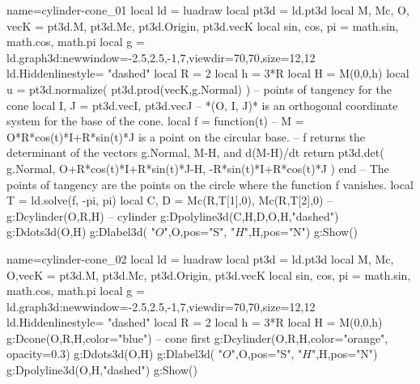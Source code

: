 \documentclass[border=3pt]{standalone}%
\begin{document}
\begin{luadraw}{name=cylinder-cone_01}
local ld = luadraw
local pt3d = ld.pt3d
local M, Mc, O, vecK = pt3d.M, pt3d.Mc, pt3d.Origin,  pt3d.vecK
local sin, cos, pi = math.sin, math.cos, math.pi
local g = ld.graph3d:new{window={-2.5,2.5,-1,7},viewdir={70,70},size={12,12}}
ld.Hiddenlinestyle= "dashed"
local R = 2
local h = 3*R
local H = M(0,0,h)
local u = pt3d.normalize( pt3d.prod(vecK,g.Normal) )
-- points of tangency for the cone
local I, J = pt3d.vecI, pt3d.vecJ -- *(O, I, J)* is an orthogonal coordinate system for the base of the cone.
local f = function(t) 
-- M = O*R*cos(t)*I+R*sin(t)*J is a point on the circular base.
-- f returns the determinant of the vectors g.Normal, M-H, and d(M-H)/dt
    return pt3d.det( g.Normal, O+R*cos(t)*I+R*sin(t)*J-H, -R*sin(t)*I+R*cos(t)*J ) 
end
-- The points of tangency are the points on the circle where the function f vanishes.
local T = ld.solve(f, -pi, pi)
local C, D = Mc(R,T[1],0), Mc(R,T[2],0)
-- 
g:Dcylinder(O,R,H) -- cylinder
g:Dpolyline3d({{C,H,D},{O,H}},"dashed")
g:Ddots3d({O,H})
g:Dlabel3d( "$O$",O,{pos="S"}, "$H$",H,{pos="N"})
g:Show()
\end{luadraw}


\begin{luadraw}{name=cylinder-cone_02}
local ld = luadraw
local pt3d = ld.pt3d
local M, Mc, O,vecK = pt3d.M, pt3d.Mc, pt3d.Origin,  pt3d.vecK
local sin, cos, pi = math.sin, math.cos, math.pi
local g = ld.graph3d:new{window={-2.5,2.5,-1,7},viewdir={70,70},size={12,12}}
ld.Hiddenlinestyle= "dashed"
local R = 2
local h = 3*R
local H = M(0,0,h)
g:Dcone(O,R,H,{color="blue"}) -- cone first
g:Dcylinder(O,R,H,{color="orange", opacity=0.3}) 
g:Ddots3d({O,H})
g:Dlabel3d( "$O$",O,{pos="S"}, "$H$",H,{pos="N"})
g:Dpolyline3d({O,H},"dashed")
g:Show()
\end{luadraw}
\end{document}
